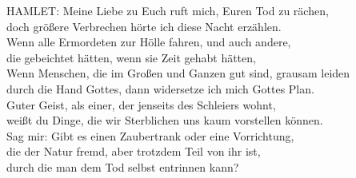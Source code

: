 {\begin{playdialog}
HAMLET: Meine Liebe zu Euch ruft mich, Euren Tod zu rächen,\\
doch größere Verbrechen hörte ich diese Nacht erzählen.\\
Wenn alle Ermordeten zur Hölle fahren, und auch andere,\\
die gebeichtet hätten, wenn sie Zeit gehabt hätten,\\
Wenn Menschen, die im Großen und Ganzen gut sind, grausam leiden\\
durch die Hand Gottes, dann widersetze ich mich Gottes Plan.\\
Guter Geist, als einer, der jenseits des Schleiers wohnt,\\
weißt du Dinge, die wir Sterblichen uns kaum vorstellen können.\\
Sag mir: Gibt es einen Zaubertrank oder eine Vorrichtung,\\
die der Natur fremd, aber trotzdem Teil von ihr ist,\\
durch die man dem Tod selbst entrinnen kann?\\


\end{playdialog}}
